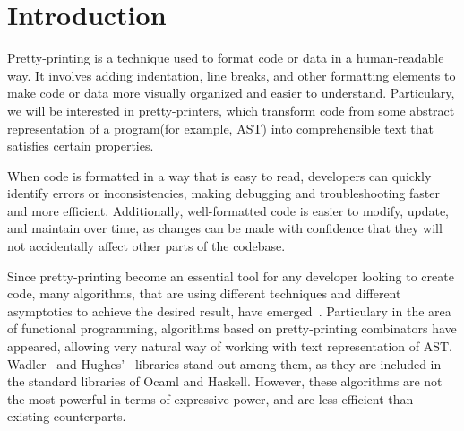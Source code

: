 \documentclass[14pt]{constructor-diploma}
\begin{document}
\maketitle
\tableofcontents
\section*{Introduction}
Pretty-printing is a technique used to format code or data in a human-readable way.
It involves adding indentation, line breaks, and other formatting elements to make code or data more visually organized and easier to understand.
Particulary, we will be interested in pretty-printers, 
which transform code from some abstract representation of a program(for example, AST)
into comprehensible text that satisfies certain properties.

When code is formatted in a way that is easy to read,
developers can quickly identify errors or inconsistencies, 
making debugging and troubleshooting faster and more efficient.
Additionally, well-formatted code is easier to modify, update, and maintain over time, 
as changes can be made with confidence that they will not accidentally affect other parts of the codebase.

Since pretty-printing become an essential tool for any developer looking to create code, many algorithms, that are using different techniques and different asymptotics to achieve the desired result,
have emerged~\cite{oppen,azero,hughes,swierstra,podkopaev,bernardy}. Particulary in the area of functional programming, algorithms based on pretty-printing combinators have appeared,
allowing very natural way of working with text representation of AST. 
Wadler~\cite{wadler} and Hughes'~\cite{hughes} libraries stand out among them, as they are included in the standard libraries of Ocaml and Haskell.
However, these algorithms are not the most powerful in terms of expressive power, and are less efficient than existing counterparts.
\end{document}
